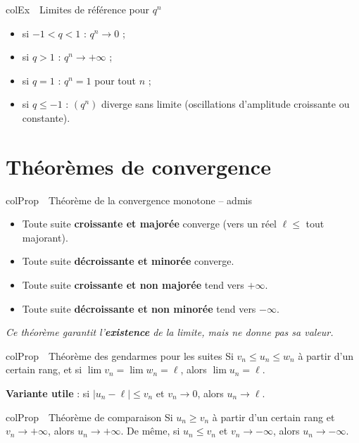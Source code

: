 \documentclass[11pt,a4paper]{article}
\newenvironment{propriete}[1][Propriété]
  {\begin{fiche}{colProp}{\ding{72}~~#1}}{\end{fiche}}
\newenvironment{exemple}[1][Exemple]
  {\begin{fiche}{colEx}{\ding{217}~~#1}}{\end{fiche}}
\begin{document}
\begin{exemple}[Limites de référence pour $q^n$]
\begin{itemize}[leftmargin=8mm, itemsep=0.5mm]
  \item si $-1 < q < 1$ : $q^n \to 0$ ;
  \item si $q > 1$ : $q^n \to +\infty$ ;
  \item si $q = 1$ : $q^n = 1$ pour tout $n$ ;
  \item si $q \leq -1$ : $(q^n)$ diverge sans limite (oscillations d'amplitude croissante ou constante).
\end{itemize}
\end{exemple}

\section{Théorèmes de convergence}

\begin{propriete}[Théorème de la convergence monotone -- admis]
\begin{itemize}[leftmargin=6mm, itemsep=0.5mm]
  \item Toute suite \textbf{croissante et majorée} converge (vers un réel $\ell \leq$ tout majorant).
  \item Toute suite \textbf{décroissante et minorée} converge.
  \item Toute suite \textbf{croissante et non majorée} tend vers $+\infty$.
  \item Toute suite \textbf{décroissante et non minorée} tend vers $-\infty$.
\end{itemize}
\emph{Ce théorème garantit l'\textbf{existence} de la limite, mais ne donne pas sa valeur.}
\end{propriete}

\begin{propriete}[Théorème des gendarmes pour les suites]
Si $v_n \leq u_n \leq w_n$ à partir d'un certain rang, et si $\lim v_n = \lim w_n = \ell$, alors $\lim u_n = \ell$.

\smallskip
\textbf{Variante utile} : si $|u_n - \ell| \leq v_n$ et $v_n \to 0$, alors $u_n \to \ell$.
\end{propriete}

\begin{propriete}[Théorème de comparaison]
Si $u_n \geq v_n$ à partir d'un certain rang et $v_n \to +\infty$, alors $u_n \to +\infty$. De même, si $u_n \leq v_n$ et $v_n \to -\infty$, alors $u_n \to -\infty$.
\end{propriete}
\end{document}
